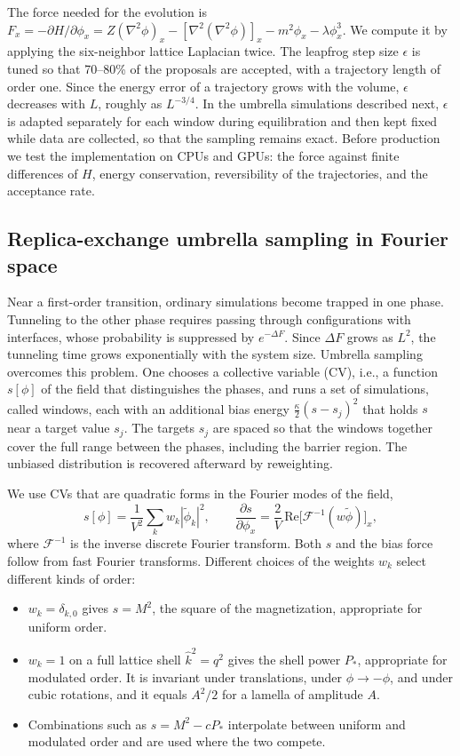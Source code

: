 \documentclass[aps,prd,twocolumn,superscriptaddress,nofootinbib,10pt]{revtex4-2}
\newcommand{\khat}{\widehat{k}^{2}}
\begin{document}
The force needed for the evolution is
$F_x=-\partial H/\partial\phi_x=Z(\nabla^2\phi)_x
-[\nabla^2(\nabla^2\phi)]_x-m^2\phi_x-\lambda\phi_x^3$.  We compute it by
applying the six-neighbor lattice Laplacian twice.  The leapfrog step size
$\epsilon$ is tuned so that 70--80\% of the proposals are accepted, with a
trajectory length of order one.  Since the energy error of a trajectory grows
with the volume, $\epsilon$ decreases with $L$, roughly as $L^{-3/4}$.  In
the umbrella simulations described next, $\epsilon$ is adapted separately for
each window during equilibration and then kept fixed while data are
collected, so that the sampling remains exact.  Before production we test the
implementation on CPUs and GPUs: the force against finite differences of $H$,
energy conservation, reversibility of the trajectories, and the acceptance
rate.

\subsection{Replica-exchange umbrella sampling in Fourier space}

Near a first-order transition, ordinary simulations become trapped in one
phase.  Tunneling to the other phase requires passing through configurations
with interfaces, whose probability is suppressed by $e^{-\Delta F}$.  Since
$\Delta F$ grows as $L^2$, the tunneling time grows exponentially with the
system size.  Umbrella sampling~\cite{Torrie1977} overcomes this problem.  One
chooses a collective variable (CV), i.e., a function $s[\phi]$ of the field
that distinguishes the phases, and runs a set of simulations, called windows,
each with an additional bias energy $\frac{\kappa}{2}(s-s_j)^2$ that holds
$s$ near a target value $s_j$.  The targets $s_j$ are spaced so that the
windows together cover the full range between the phases, including the
barrier region.  The unbiased distribution is recovered afterward by
reweighting.

We use CVs that are quadratic forms in the Fourier modes of the field,
\begin{equation}
 s[\phi]=\frac{1}{V^2}\sum_k w_k|\tilde\phi_k|^2,\qquad
 \frac{\partial s}{\partial\phi_x}=\frac{2}{V}\,
 \mathrm{Re}\bigl[\mathcal F^{-1}(w\tilde\phi)\bigr]_x,
 \label{eq:cv}
\end{equation}
where $\mathcal F^{-1}$ is the inverse discrete Fourier transform.  Both $s$
and the bias force follow from fast Fourier transforms.  Different choices of
the weights $w_k$ select different kinds of order:
\begin{itemize}
 \item $w_k=\delta_{k,0}$ gives $s=M^2$, the square of the magnetization,
 appropriate for uniform order.
 \item $w_k=1$ on a full lattice shell $\khat=q^2$ gives the shell power
 $P_*$, appropriate for modulated order.  It is invariant under
 translations, under $\phi\to-\phi$, and under cubic rotations, and it equals
 $A^2/2$ for a lamella of amplitude $A$.
 \item Combinations such as $s=M^2-cP_*$ interpolate between uniform and
 modulated order and are used where the two compete.
\end{itemize}
\end{document}
